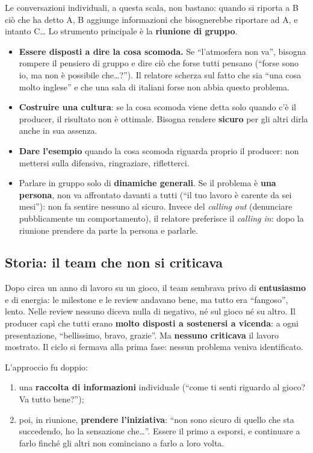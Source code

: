 Le conversazioni individuali, a questa scala, non bastano: quando si riporta a B
ciò che ha detto A, B aggiunge informazioni che bisognerebbe riportare ad A, e
intanto C\ldots{} Lo strumento principale è la \textbf{riunione di gruppo}.
\begin{itemize}
  \item \textbf{Essere disposti a dire la cosa scomoda.} Se ``l'atmosfera non va'',
        bisogna rompere il pensiero di gruppo e dire ciò che forse tutti pensano
        (``forse sono io, ma non è possibile che\ldots?''). Il relatore scherza
        sul fatto che sia ``una cosa molto inglese'' e che una sala di italiani
        forse non abbia questo problema.
  \item \textbf{Costruire una cultura}: se la cosa scomoda viene detta solo quando
        c'è il producer, il risultato non è ottimale. Bisogna rendere
        \textbf{sicuro} per gli altri dirla anche in sua assenza.
  \item \textbf{Dare l'esempio} quando la cosa scomoda riguarda proprio il
        producer: non mettersi sulla difensiva, ringraziare, rifletterci.
  \item Parlare in gruppo solo di \textbf{dinamiche generali}. Se il problema è
        \textbf{una persona}, non va affrontato davanti a tutti (``il tuo lavoro è
        carente da sei mesi''): non fa sentire nessuno al sicuro. Invece del
        \emph{calling out} (denunciare pubblicamente un comportamento), il relatore
        preferisce il \emph{calling in}: dopo la riunione prendere da parte la
        persona e parlarle.
\end{itemize}

\subsection{Storia: il team che non si criticava}

Dopo circa un anno di lavoro su un gioco, il team sembrava privo di
\textbf{entusiasmo} e di energia: le milestone e le review andavano bene, ma tutto
era ``fangoso'', lento. Nelle review nessuno diceva nulla di negativo, né sul gioco
né su altro. Il producer capì che tutti erano \textbf{molto disposti a sostenersi a
vicenda}: a ogni presentazione, ``bellissimo, bravo, grazie''. Ma \textbf{nessuno
criticava} il lavoro mostrato. Il ciclo si fermava alla prima fase: nessun problema
veniva identificato.

L'approccio fu doppio:
\begin{enumerate}
  \item una \textbf{raccolta di informazioni} individuale (``come ti senti riguardo
        al gioco? Va tutto bene?'');
  \item poi, in riunione, \textbf{prendere l'iniziativa}: ``non sono sicuro di
        quello che sta succedendo, ho la sensazione che\ldots''. Essere il primo a
        esporsi, e continuare a farlo finché gli altri non cominciano a farlo a loro
        volta.
\end{enumerate}

